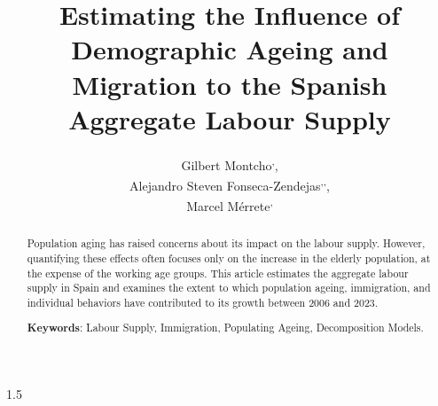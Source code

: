 \documentclass{article}
\title{\textbf{Estimating the Influence of Demographic Ageing and Migration to the Spanish Aggregate Labour Supply}}
\author{
  Gilbert Montcho\textsuperscript{\affiliationA,\equalcontributor},\\
  Alejandro Steven Fonseca-Zendejas\textsuperscript{\affiliationB,\equalcontributor,\correspondingA},\\
  Marcel Mérrete\textsuperscript{\affiliationC,\equalcontributor}
}
\makeatletter
\newcommand{\myfnsymbol}[1]{%
  \expandafter\@myfnsymbol\csname c@#1\endcsname
}
\newcommand{\@myfnsymbol}[1]{%
  \ifcase #1
  \or 1%
  \or 2%
  \or 3%
  \or \TextOrMath{\textasteriskcentered}{*}%
  \or \TextOrMath{\textdagger}{\dagger}%
  \fi
}
\makeatother
\begin{document}
\begin{spacing}{1.5}

\renewcommand{\thefootnote}{\myfnsymbol{footnote}}
\maketitle
%
%
%
%
%

\setcounter{footnote}{0}%
\renewcommand{\thefootnote}{\fnsymbol{footnote}}

\begin{abstract}
\noindent Population aging has raised concerns about its impact on the labour supply. However, quantifying these effects often focuses only on the increase in the elderly population, at the expense of the working age groups. This article estimates the aggregate labour supply in Spain and examines the extent to which population ageing, immigration, and individual behaviors have contributed to its growth between 2006 and 2023.

\vspace{0.7em}\par
\textbf{Keywords}: Labour Supply, Immigration, Populating Ageing, Decomposition Models.
\end{abstract}

\newpage 

\tableofcontents
\newpage  


\end{spacing}
\end{document}

